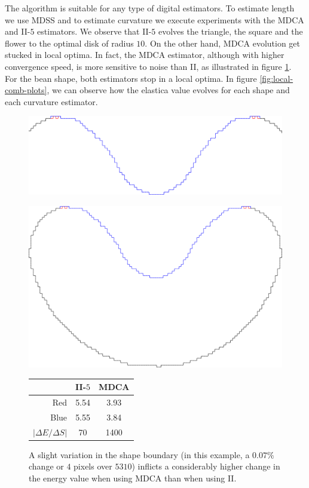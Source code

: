 The algorithm is suitable for any type of digital estimators. To estimate length we use MDSS and to estimate curvature we execute experiments with the MDCA and II-$5$ estimators. We observe that II-$5$ evolves the triangle, the square and the flower to the optimal disk of radius $10$. On the other hand, MDCA evolution get stucked in local optima. In fact, the MDCA estimator, although with higher convergence speed, is more sensitive to noise than II, as illustrated in figure \ref{fig:mdca-sensitivity}. For the bean shape, both estimators stop in a local optima. In figure \ref{fig:local-comb-plots}, we can observe how the elastica value evolves for each shape and each curvature estimator.








\begin{figure}[h!]
\begin{minipage}[b]{0.6\textwidth}
\center
\includegraphics[scale=0.15]{figures/mdca-sensitivity/closer-picture.pdf}
\end{minipage}%
\begin{minipage}[b]{0.4\textwidth}
\center
\includegraphics[scale=0.025]{figures/mdca-sensitivity/big-picture.pdf}\\\vspace{2em}
\captionsetup{type=table}
\begin{tabular}{r|c|c}
& II-$5$ & MDCA \\
\hline
Red  & 5.54 & 3.93\\
Blue & 5.55 & 3.84\\
\hline
$| \Delta E / \Delta S |$ & 70 & 1400
\end{tabular}
\end{minipage}
\caption{A slight variation in the shape boundary (in this example, a $0.07\%$ change or $4$ pixels over $5310$) inflicts a considerably higher change in the energy value when using MDCA than when using II. }
\label{fig:mdca-sensitivity}
\end{figure}
